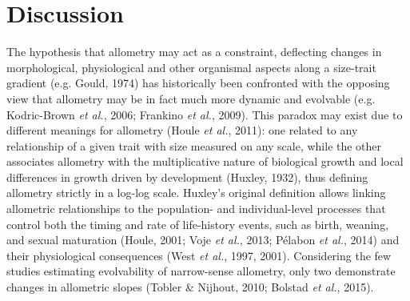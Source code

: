 \documentclass[12pt,twoside]{report}
\begin{document}
\section{Discussion}\label{discussion-1}

The hypothesis that allometry may act as a constraint, deflecting
changes in morphological, physiological and other organismal aspects
along a size-trait gradient (e.g. Gould, 1974) has historically been
confronted with the opposing view that allometry may be in fact much
more dynamic and evolvable (e.g. Kodric-Brown \emph{et al.}, 2006;
Frankino \emph{et al.}, 2009). This paradox may exist due to different
meanings for allometry (Houle \emph{et al.}, 2011): one related to any
relationship of a given trait with size measured on any scale, while the
other associates allometry with the multiplicative nature of biological
growth and local differences in growth driven by development (Huxley,
1932), thus defining allometry strictly in a log-log scale. Huxley's
original definition allows linking allometric relationships to the
population- and individual-level processes that control both the timing
and rate of life-history events, such as birth, weaning, and sexual
maturation (Houle, 2001; Voje \emph{et al.}, 2013; Pélabon \emph{et
al.}, 2014) and their physiological consequences (West \emph{et al.},
1997, 2001). Considering the few studies estimating evolvability of
narrow-sense allometry, only two demonstrate changes in allometric
slopes (Tobler \& Nijhout, 2010; Bolstad \emph{et al.}, 2015).
\end{document}
